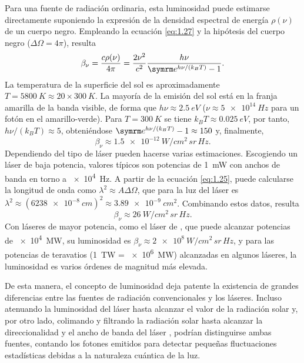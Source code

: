Para una fuente de radiación ordinaria, esta luminosidad puede estimarse directamente suponiendo la expresión de la densidad espectral de energía $\rho(\nu)$ de un cuerpo negro. Empleando la ecuación \eqref{eq:1.27} y la hipótesis del cuerpo negro ($\Delta\Omega=4 \pi$), resulta
\begin{equation}\label{eq:1.28}
    \beta_{\nu} = \frac{c \rho(\nu)}{4 \pi} = \frac{2 \nu^{2}}{c^{2}}\frac{h \nu}{\eu^{h \nu/(k_{B}T)}-1}.
\end{equation}
La temperatura de la superficie del sol es aproximadamente $T = \qty{5800}{K} \approx 20 \times \qty{300}{K}$. La mayoría de la emisión del sol está en la franja amarilla de la banda visible, de forma que $h\nu \approx \qty{2,5}{eV}$ ($\nu \approx \qty{5e14}{Hz}$ para un fotón en el amarillo-verde). Para $T = \qty{300}{K}$ se tiene $k_{B}T \approx \qty{0,025}{eV}$, por tanto, $h \nu/(k_{B}T) \approx 5$, obteniéndose $\eu^{h \nu/(k_{B}T)}-1 \approx 150$ y, finalmente,
\begin{equation}\label{eq:1.29}
    \beta_{\nu} \approx \qty{1,5e-12}{W/cm^{2}\,sr\,Hz}.
\end{equation}
Dependiendo del tipo de láser pueden hacerse varias estimaciones. Escogiendo un láser  de baja potencia, valores típicos\autocite{Milonni1988} son potencias de \qty{1}{mW} con anchos de banda en torno a \qty{e4}{Hz}. A partir de la ecuación \eqref{eq:1.25}, puede calcularse la longitud de onda como $\lambda^{2} \approx A\Delta\Omega$, que para la luz del láser  es $\lambda^{2} \approx (\qty{6238e-8}{cm})^{2} \approx \qty{3,89e-9}{cm^{2}}$. Combinando estos datos, resulta 
\begin{equation}\label{eq:1.30}
    \beta_{\nu} \approx \qty{26}{W/cm^{2}\,sr\,Hz}.
\end{equation}
Con láseres de mayor potencia, como el láser de , que puede alcanzar potencias de \qty{e4}{MW}, su luminosidad es $\beta_{\nu} \approx \qty{2e8}{W/cm^{2}\,sr\,Hz}$, y para las potencias de teravatios (\qty{1}{TW} = \qty{e6}{MW}) alcanzadas en algunos láseres, la luminosidad es varios órdenes de magnitud más elevada.

De esta manera, el concepto de luminosidad deja patente la existencia de grandes diferencias entre las fuentes de radiación convencionales y los láseres. Incluso atenuando la luminosidad del láser  hasta alcanzar el valor de la radiación solar y, por otro lado, colimando y filtrando la radiación solar hasta alcanzar la direccionalidad y el ancho de banda del láser , podrían distinguirse ambas fuentes, contando los fotones emitidos para detectar pequeñas fluctuaciones estadísticas debidas a la naturaleza cuántica de la luz. 

